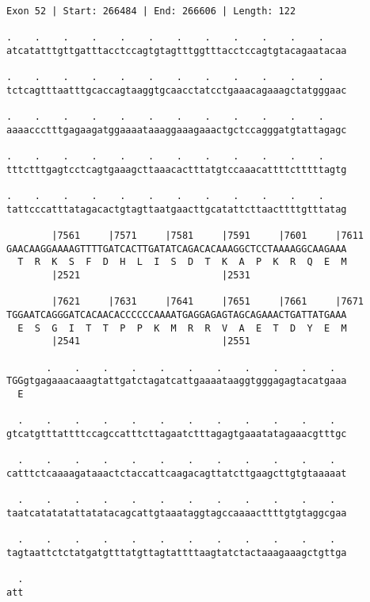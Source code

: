 \documentclass{article}
\begin{document}
\newpage
\begin{Verbatim}
Exon 52 | Start: 266484 | End: 266606 | Length: 122
 
.    .    .    .    .    .    .    .    .    .    .    .    
atcatatttgttgatttacctccagtgtagtttggtttacctccagtgtacagaatacaa
  
.    .    .    .    .    .    .    .    .    .    .    .    
tctcagtttaatttgcaccagtaaggtgcaacctatcctgaaacagaaagctatgggaac
  
.    .    .    .    .    .    .    .    .    .    .    .    
aaaaccctttgagaagatggaaaataaaggaaagaaactgctccagggatgtattagagc
  
.    .    .    .    .    .    .    .    .    .    .    .    
tttctttgagtcctcagtgaaagcttaaacactttatgtccaaacattttctttttagtg
  
.    .    .    .    .    .    .    .    .    .    .    .    
tattcccatttatagacactgtagttaatgaacttgcatattcttaacttttgtttatag
  
        |7561     |7571     |7581     |7591     |7601     |7611
GAACAAGGAAAAGTTTTGATCACTTGATATCAGACACAAAGGCTCCTAAAAGGCAAGAAA
  T  R  K  S  F  D  H  L  I  S  D  T  K  A  P  K  R  Q  E  M
        |2521                         |2531                 
  
        |7621     |7631     |7641     |7651     |7661     |7671
TGGAATCAGGGATCACAACACCCCCCAAAATGAGGAGAGTAGCAGAAACTGATTATGAAA
  E  S  G  I  T  T  P  P  K  M  R  R  V  A  E  T  D  Y  E  M
        |2541                         |2551                 
  
       .    .    .    .    .    .    .    .    .    .    .  
TGGgtgagaaacaaagtattgatctagatcattgaaaataaggtgggagagtacatgaaa
  E                                                         
  
  .    .    .    .    .    .    .    .    .    .    .    .  
gtcatgtttattttccagccatttcttagaatctttagagtgaaatatagaaacgtttgc
  
  .    .    .    .    .    .    .    .    .    .    .    .  
catttctcaaaagataaactctaccattcaagacagttatcttgaagcttgtgtaaaaat
  
  .    .    .    .    .    .    .    .    .    .    .    .  
taatcatatatattatatacagcattgtaaataggtagccaaaacttttgtgtaggcgaa
  
  .    .    .    .    .    .    .    .    .    .    .    .  
tagtaattctctatgatgtttatgttagtattttaagtatctactaaagaaagctgttga
  
  .
att
\end{Verbatim}
\newpage
\end{document}
